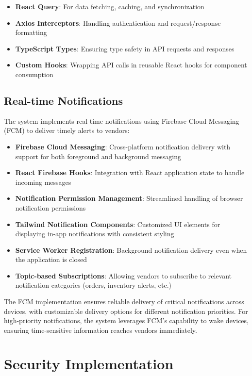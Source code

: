 \begin{itemize}
    \item \textbf{React Query}: For data fetching, caching, and synchronization
    \item \textbf{Axios Interceptors}: Handling authentication and request/response formatting
    \item \textbf{TypeScript Types}: Ensuring type safety in API requests and responses
    \item \textbf{Custom Hooks}: Wrapping API calls in reusable React hooks for component consumption
\end{itemize}

\subsection{Real-time Notifications}

The system implements real-time notifications using Firebase Cloud Messaging (FCM) to deliver timely alerts to vendors:

\begin{itemize}
    \item \textbf{Firebase Cloud Messaging}: Cross-platform notification delivery with support for both foreground and background messaging
    \item \textbf{React Firebase Hooks}: Integration with React application state to handle incoming messages
    \item \textbf{Notification Permission Management}: Streamlined handling of browser notification permissions
    \item \textbf{Tailwind Notification Components}: Customized UI elements for displaying in-app notifications with consistent styling
    \item \textbf{Service Worker Registration}: Background notification delivery even when the application is closed
    \item \textbf{Topic-based Subscriptions}: Allowing vendors to subscribe to relevant notification categories (orders, inventory alerts, etc.)
\end{itemize}

The FCM implementation ensures reliable delivery of critical notifications across devices, with customizable delivery options for different notification priorities. For high-priority notifications, the system leverages FCM's capability to wake devices, ensuring time-sensitive information reaches vendors immediately.
\section{Security Implementation}
